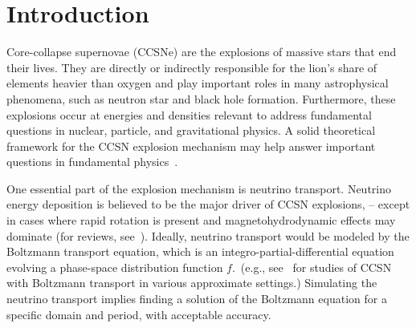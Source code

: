 \section{Introduction}

Core-collapse supernovae (CCSNe) are the explosions of massive stars that end their lives.
They are directly or indirectly responsible for the lion's share of elements heavier than oxygen and play important roles in many astrophysical phenomena, such as neutron star and black hole formation.
Furthermore, these explosions occur at energies and densities relevant to address fundamental questions in nuclear, particle, and gravitational physics. 
A solid theoretical framework for the CCSN explosion mechanism may help answer important questions in fundamental physics~\cite{janka_etal_2007}.

One essential part of the explosion mechanism is neutrino transport.
Neutrino energy deposition is believed to be the major driver of CCSN explosions, -- except in cases where rapid rotation is present and magnetohydrodynamic effects may dominate (for reviews, see~\cite{mezzacappa_2005,janka_2012,burrows_2013,muller_2016}).
Ideally, neutrino transport would be modeled by the Boltzmann transport equation, which is an integro-partial-differential equation evolving a phase-space distribution function $f$.~(e.g., see~\cite{mezzacappaBruenn_1993a,mezzacappaBruenn_1993b,mezzacappaBruenn_1993c,mezzacappa_etal_2001,liebendoerfer_etal_2001,liebendoerfer_etal_2004,livne_etal_2004,liebendoerfer_etal_2005,ott_etal_2008,sumiyoshiYamada_2012,nagakura_etal_2014,sumiyoshi_etal_2014,nagakura_etal_2018} for studies of CCSN with Boltzmann transport in various approximate settings.)
Simulating the neutrino transport implies finding a solution of the Boltzmann equation for a specific domain and period, with acceptable accuracy.

